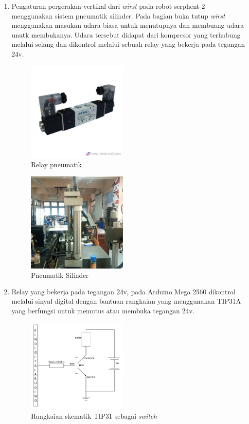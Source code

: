 \begin{enumerate}
\item Pengaturan pergerakan vertikal dari \textit{wirst} pada robot serphent-2 menggunakan sistem pneumatik silinder. Pada bagian buka tutup \textit{wirst} menggunakan masukan udara biasa untuk menutupnya dan membuang udara unutk membukanya. Udara tersebut didapat dari kompresor yang terhubung melalui selang dan dikontrol melalui sebuah relay yang bekerja pada tegangan 24v.

\begin{figure}[H]
	\centering
	\includegraphics[width=5cm	]{relay.jpg}
	\caption{Relay pneumatik}
\end{figure}
\begin{figure}[H]
	\centering
	\includegraphics[width=5cm	]{relay2.jpg}
	\caption{Pneumatik Silinder}
\end{figure}

\item Relay yang bekerja pada tegangan 24v, pada Arduino Mega 2560 dikontrol melalui sinyal digital dengan bantuan rangkaian yang menggunakan TIP31A yang berfungsi untuk memutus atau membuka tegangan 24v. 
\begin{figure}[H]
	\centering
	\includegraphics[width=5cm	]{relay3.jpg}
	\caption{Rangkaian skematik TIP31 sebagai \textit{switch}}
\end{figure}


\end{enumerate}
